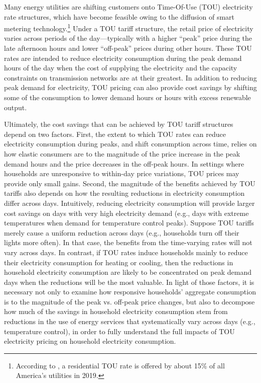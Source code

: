 Many energy utilities are shifting customers onto Time-Of-Use (TOU) electricity rate structures, which have become feasible owing to the diffusion of smart metering technology.\footnote{According to \cite{A-Survey-of-Residential-TOU-Rates_FHS_2019}, a residential TOU rate is offered by about 15\% of all America's utilities in 2019.} Under a TOU tariff structure, the retail price of electricity varies across periods of the day---typically with a higher ``peak'' price during the late afternoon hours and lower ``off-peak'' prices during other hours. These TOU rates are intended to reduce electricity consumption during the peak demand hours of the day when the cost of supplying the electricity and the capacity constraints on transmission networks are at their greatest. In addition to reducing peak demand for electricity, TOU pricing can also provide cost savings by shifting some of the consumption to lower demand hours or hours with excess renewable output. 

Ultimately, the cost savings that can be achieved by TOU tariff structures depend on two factors. First, the extent to which TOU rates can reduce electricity consumption during peaks, and shift consumption across time, relies on how elastic consumers are to the magnitude of the price increase in the peak demand hours and the price decreases in the off-peak hours. In settings where households are unresponsive to within-day price variations, TOU prices may provide only small gains. Second, the magnitude of the benefits achieved by TOU tariffs also depends on how the resulting reductions in electricity consumption differ across days. Intuitively, reducing electricity consumption will provide larger cost savings on days with very high electricity demand (e.g., days with extreme temperatures when demand for temperature control peaks). Suppose TOU tariffs merely cause a uniform reduction across days (e.g., households turn off their lights more often). In that case, the benefits from the time-varying rates will not vary across days. In contrast, if TOU rates induce households mainly to reduce their electricity consumption for heating or cooling, then the reductions in household electricity consumption are likely to be concentrated on peak demand days when the reductions will be the most valuable. In light of those factors, it is necessary not only to examine how responsive households' aggregate consumption is to the magnitude of the peak vs. off-peak price changes, but also to decompose how much of the savings in household electricity consumption stem from reductions in the use of energy services that systematically vary across days (e.g., temperature control), in order to fully understand the full impacts of TOU electricity pricing on household electricity consumption. 

